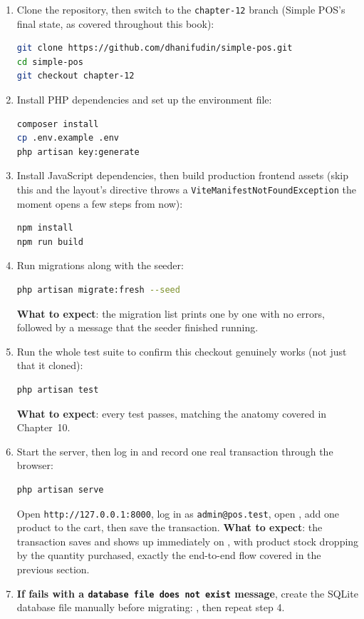 \begin{enumerate}
  \item Clone the repository, then switch to the \texttt{chapter-12}
    branch (Simple POS's final state, as covered throughout this
    book):
    \begin{lstlisting}[language=bash]
git clone https://github.com/dhanifudin/simple-pos.git
cd simple-pos
git checkout chapter-12
    \end{lstlisting}
  \item Install PHP dependencies and set up the environment file:
    \begin{lstlisting}[language=bash]
composer install
cp .env.example .env
php artisan key:generate
    \end{lstlisting}
  \item Install JavaScript dependencies, then build production frontend
    assets (skip this and the layout's  directive throws a
    \texttt{ViteManifestNotFoundException} the moment  opens
    a few steps from now):
    \begin{lstlisting}[language=bash]
npm install
npm run build
    \end{lstlisting}
  \item Run migrations along with the seeder:
    \begin{lstlisting}[language=bash]
php artisan migrate:fresh --seed
    \end{lstlisting}
    \textbf{What to expect}: the migration list prints one by one with
    no errors, followed by a message that the seeder finished running.
  \item Run the whole test suite to confirm this checkout genuinely
    works (not just that it cloned):
    \begin{lstlisting}[language=bash]
php artisan test
    \end{lstlisting}
    \textbf{What to expect}: every test passes, matching the anatomy
    covered in Chapter~10.
  \item Start the server, then log in and record one real transaction
    through the browser:
    \begin{lstlisting}[language=bash]
php artisan serve
    \end{lstlisting}
    Open \texttt{http://127.0.0.1:8000}, log in as
    \texttt{admin@pos.test}, open , add one product to the
    cart, then save the transaction. \textbf{What to expect}: the
    transaction saves and shows up immediately on
    , with product stock dropping by the quantity
    purchased, exactly the end-to-end flow covered in the previous
    section.
  \item \textbf{If  fails with a
    \texttt{database file does not exist} message}, create the SQLite
    database file manually before migrating: , then repeat step 4.
\end{enumerate}

